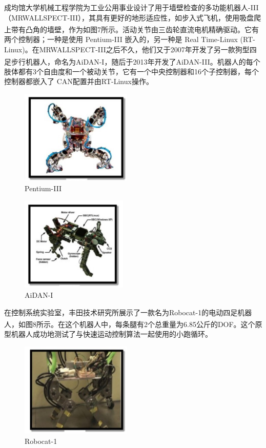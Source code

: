 \documentclass[12pt,a4paper]{ctexart}
\newcommand{\supercite}[1]{\textsuperscript{\cite{#1}}}
\begin{document}
成均馆大学机械工程学院为工业公用事业设计了用于墙壁检查的多功能机器人-III（MRWALLSPECT-III），其具有更好的地形适应性，如步入式飞机，使用吸盘爬上带有凸角的墙壁，作为如图7\supercite{20}所示。活动关节由三齿轮直流电机精确驱动。它有两个控制器；一种是使用 Pentium-III 嵌入的，另一种是 Real Time-Linux (RT-Linux)。在MRWALLSPECT-III之后不久，他们又于2007年开发了另一款狗型四足步行机器人，命名为AiDAN-I，随后于2013年开发了AiDAN-III\supercite{21}\supercite{22}。机器人的每个肢体都有3个自由度和一个被动关节，它有一个中央控制器和16个子控制器，每个控制器都嵌入了 CAN配置并由RT-Linux操作。
\begin{figure}[H]
    \centering
    \includegraphics[height=4.5cm]{IMG_07.jpg}
    \caption{Pentium-III}
\end{figure}
\begin{figure}[H]
    \centering
    \includegraphics[height=4.5cm]{IMG_06.jpg}
    \caption{AiDAN-I}
\end{figure}
在控制系统实验室，丰田技术研究所展示了一款名为Robocat-1的电动四足机器人，如图8\supercite{23}所示。在这个机器人中，每条腿有2个总重量为6.85公斤的DOF。这个原型机器人成功地测试了与快速运动控制算法一起使用的小跑循环。
\begin{figure}[H]
    \centering
    \includegraphics[height=4.5cm]{IMG_08.jpg}
    \caption{Robocat-1}
\end{figure}
\end{document}
